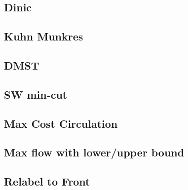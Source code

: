 \documentclass[a4paper,10pt,twocolumn,oneside]{article}
\begin{document}
\subsection{Dinic}


%

%

\subsection{Kuhn Munkres}


\subsection{DMST}


\subsection{SW min-cut}


\subsection{Max Cost Circulation}


%

\subsection{Max flow with lower/upper bound}


\subsection{Relabel to Front}

\end{document}
